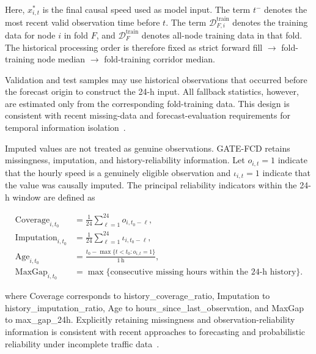 \documentclass[pdflatex,sn-mathphys-num,iicol]{sn-jnl}
\begin{document}
Here, $x^{*}_{i,t}$ is the final causal speed used as model input. The term $t^{-}$ denotes the most recent valid observation time before $t$. The term $\mathcal{D}^{\mathrm{train}}_{F,i}$ denotes the training data for node $i$ in fold $F$, and $\mathcal{D}^{\mathrm{train}}_{F}$ denotes all-node training data in that fold. The historical processing order is therefore fixed as strict forward fill $\rightarrow$ fold-training node median $\rightarrow$ fold-training corridor median.

Validation and test samples may use historical observations that occurred before the forecast origin to construct the 24-h input. All fallback statistics, however, are estimated only from the corresponding fold-training data. This design is consistent with recent missing-data and forecast-evaluation requirements for temporal information isolation~\cite{Qu2024TrafficPredictionImputation,Hewamalage2023ForecastEvaluation,Chan2023MissingTrafficData}.

Imputed values are not treated as genuine observations. GATE-FCD retains missingness, imputation, and history-reliability information. Let $o_{i,t}=1$ indicate that the hourly speed is a genuinely eligible observation and $\iota_{i,t}=1$ indicate that the value was causally imputed. The principal reliability indicators within the 24-h window are defined as

\begin{equation}
\begin{aligned}
\mathrm{Coverage}_{i,t_0}
&=
\frac{1}{24}
\sum_{\ell=1}^{24}
o_{i,t_0-\ell},
\\[6pt]

\mathrm{Imputation}_{i,t_0}
&=
\frac{1}{24}
\sum_{\ell=1}^{24}
\iota_{i,t_0-\ell},
\\[6pt]

\mathrm{Age}_{i,t_0}
&=
\frac{
t_0-\max\{t<t_0:o_{i,t}=1\}
}{
1\,\mathrm{h}
},
\\[6pt]

\mathrm{MaxGap}_{i,t_0}
&=
\max\{
\text{consecutive missing hours within the 24-h history}
\}.
\end{aligned}
\label{eq:history-reliability}
\end{equation}

where Coverage corresponds to history\_coverage\_ratio, Imputation to history\_imputation\_ratio, Age to hours\_since\_last\_observation, and MaxGap to max\_gap\_24h. Explicitly retaining missingness and observation-reliability information is consistent with recent approaches to forecasting and probabilistic reliability under incomplete traffic data~\cite{Xu2023AGNP,Chan2023MissingTrafficData}.
\end{document}
